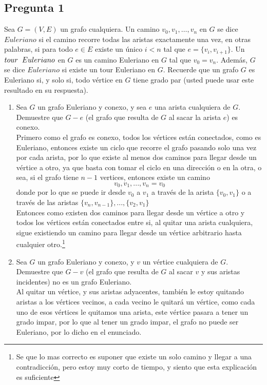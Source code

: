 \documentclass[letter]{article}
\begin{document}
	\begin{pregunta}{1}
	
		\section*{Pregunta 1}
		Sea $G = (V,E)$ un grafo cualquiera. Un camino $v_0,v_1,\ldots,v_n$ en $G$ se dice $Euleriano$ si el camino recorre todas las aristas exactamente una vez, en otras palabras, si para todo $e\in E$ existe un único $i<n$ tal que $e=\{v_i, v_{i+1}\}$. Un $tour\hspace*{2mm}Euleriano$ en $G$ es un camino Euleriano en $G$ tal que $v_0=v_n$. Además, $G$ se dice $Euleriano$ si existe un tour Euleriano en $G$. Recuerde que un grafo $G$ es Euleriano si, y solo si, todo vértice en $G$ tiene grado par (usted puede usar este resultado en su respuesta).
		\begin{enumerate}
		\item Sea $G$ un grafo Euleriano y conexo, y sea $e$ una arista cualquiera de $G$. Demuestre que $G- e$ (el grafo que resulta de $G$ al sacar la arista $e$) es conexo.\\
		
		Primero como el grafo es conexo, todos los vértices están conectados, como es Euleriano, entonces existe un ciclo que recorre el grafo pasando solo una vez por cada arista, por lo que existe al menos dos caminos para llegar desde un vértice a otro, ya que basta con tomar el ciclo en una dirección o en la otra, o sea, si el grafo tiene $n-1$ vertices, entonces existe un camino
		\[v_0, v_1, ...,v_n=v_0\]
		donde por lo que se puede ir desde $v_0$ a $v_1$ a través de la arista $\{v_0, v_1\}$ o a través de las aristas $\{v_n, v_{n-1}\}, ..., \{v_2, v_1\}$\\
		Entonces como existen dos caminos para llegar desde un vértice a otro y todos los vértices están conectados entre si, al quitar una arista cualquiera, sigue existiendo un camino para llegar desde un vértice arbitrario hasta cualquier otro.\footnote{Se que lo mas correcto es suponer que existe un solo camino y llegar a una contradicción, pero estoy muy corto de tiempo, y siento que esta explicación es suficiente}
		\item Sea $G$ un grafo Euleriano y conexo, y $v$ un vértice cualquiera de $G$. Demuestre que $G-v$ (el grafo que resulta de $G$ al sacar $v$ y sus aristas incidentes) no es un grafo Euleriano.\\
		Al quitar un vértice, y sus aristas adyacentes, también le estoy quitando aristas a los vértices vecinos, a cada vecino le quitará un vértice, como cada uno de esos vértices le quitamos una arista, este vértice pasara a tener un grado impar, por lo que al tener un grado impar, el grafo no puede ser Euleriano, por lo dicho en el enunciado.
		\end{enumerate}
		
			
	\end{pregunta}
\end{document}
